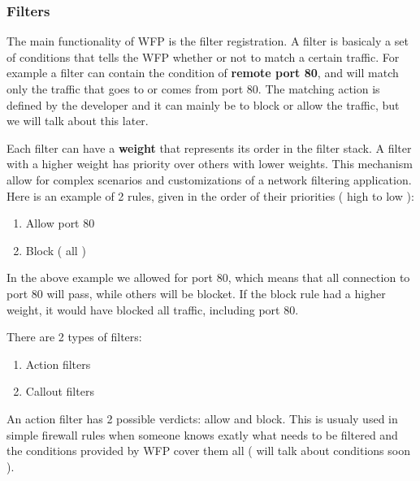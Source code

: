 \vspace{5mm}

\subsubsection{Filters}

\vspace{5mm}
The main functionality of WFP is the filter registration. A filter is basicaly a set of conditions that tells the WFP whether or not to match a certain traffic. For example a filter can contain the condition of \textbf{remote port 80}, and will match only the traffic that goes to or comes from port 80. The matching action is defined by the developer and it can mainly be to block or allow the traffic, but we will talk about this later.

\vspace{5mm}
Each filter can have a \textbf{weight} that represents its order in the filter stack. A filter with a higher weight has priority over others with lower weights. This mechanism allow for complex scenarios and customizations of a network filtering application.
Here is an example of 2 rules, given in the order of their priorities ( high to low ):
\vspace{5mm}
\begin{enumerate}
\item Allow port 80
\item Block ( all )
\end{enumerate}

\vspace{5mm}
In the above example we allowed for port 80, which means that all connection to port 80 will pass, while others will be blocket. If the block rule had a higher weight, it would have blocked all traffic, including port 80.

\vspace{5mm}
There are 2 types of filters:
\vspace{5mm}

\begin{enumerate}
\item Action filters
\item Callout filters
\end{enumerate}

\vspace{5mm}
An action filter has 2 possible verdicts: allow and block. This is usualy used in simple firewall rules when someone knows exatly what needs to be filtered and the conditions provided by WFP cover them all ( will talk about conditions soon ).
\vspace{5mm}

